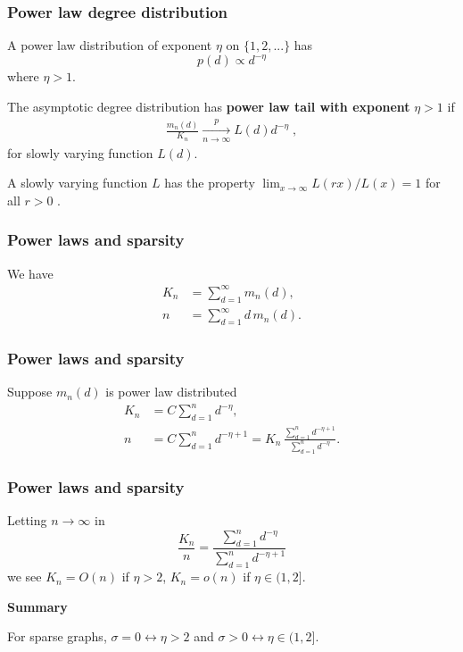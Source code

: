 \documentclass[final,hyperref={pdfpagelabels=false},noamsthm]{beamer}
\begin{document}
\begin{frame}
	\frametitle{Power law degree distribution}
	A power law distribution of exponent $\eta$ on $\{1, 2, ...\}$ has
	\begin{equation*}
	p(d) \propto d^{-\eta} 
	\end{equation*}
	where $\eta > 1$.
	
	\pause
	The asymptotic degree distribution has \textbf{power law tail with exponent} $\eta > 1$ if
	\begin{align} 
	\label{eq:plaw}
	\frac{m_{n}(d)}{K_n} \xrightarrow[n\to\infty]{p} L(d)d^{-\eta} \;,
	\end{align}
	for slowly varying function $L(d)$.
	
	\vspace{20pt}
	\pause
	\small{A slowly varying function $L$ has the property ${\lim_{x\to\infty} L(rx)/L(x) = 1}$ for all ${r>0}$ \cite{bingham1989}.}
\end{frame}

\begin{frame}
	\frametitle{Power laws and sparsity}
	We have
	\begin{align*}
		K_n &= \sum_{d=1}^\infty m_n(d), \\
		n &= \sum_{d=1}^\infty d\, m_n(d).
	\end{align*}
\end{frame}

\begin{frame}
	\frametitle{Power laws and sparsity}
	Suppose $m_n(d)$ is power law distributed
	\begin{align*}
	K_n &= C \sum_{d=1}^n d^{-\eta}, \\
	n &= C \sum_{d=1}^n d^{-\eta + 1} = K_n \, \frac{\sum_{d=1}^n d^{-\eta + 1}}{\sum_{d=1}^n d^{-\eta}}.
	\end{align*}
\end{frame}

\begin{frame}
	\frametitle{Power laws and sparsity}
	Letting $n\to \infty$ in
	\begin{equation*}
		\frac{K_n}{n} = \frac{\sum_{d=1}^n d^{-\eta}}{\sum_{d=1}^n d^{-\eta + 1}}
	\end{equation*}
	we see $K_n = O(n)$ if $\eta > 2$, $K_n = o(n)$ if $\eta \in (1, 2]$.
	\vspace{40pt}
	\pause
	
	\textbf{Summary}
	
	For sparse graphs, $\sigma=0 \leftrightarrow \eta > 2$ and $\sigma > 0 \leftrightarrow \eta \in (1,2]$.
\end{frame}
\end{document}
